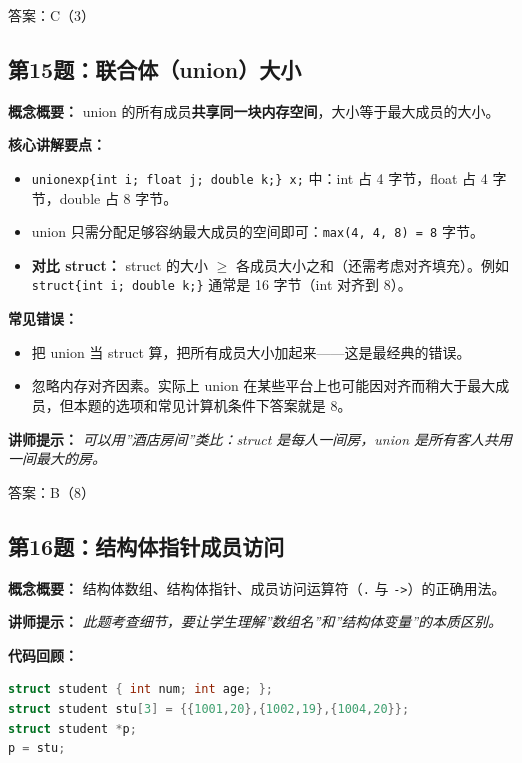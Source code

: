 {\color{highlight}答案：C（3）}

\subsection{第15题：联合体（union）大小}

\textbf{概念概要：} union 的所有成员\textbf{共享同一块内存空间}，大小等于最大成员的大小。

\textbf{核心讲解要点：}
\begin{itemize}
    \item \texttt{unionexp\{int i; float j; double k;\} x;} 中：int 占 4 字节，float 占 4 字节，double 占 8 字节。
    \item union 只需分配足够容纳最大成员的空间即可：\texttt{max(4, 4, 8) = 8} 字节。
    \item \textbf{对比 struct：} struct 的大小 $\geq$ 各成员大小之和（还需考虑对齐填充）。例如 \texttt{struct\{int i; double k;\}} 通常是 16 字节（int 对齐到 8）。
\end{itemize}

\textbf{常见错误：}
\begin{itemize}
    \item 把 union 当 struct 算，把所有成员大小加起来——这是最经典的错误。
    \item 忽略内存对齐因素。实际上 union 在某些平台上也可能因对齐而稍大于最大成员，但本题的选项和常见计算机条件下答案就是 8。
\end{itemize}

\textbf{讲师提示：} \textit{可以用”酒店房间”类比：struct 是每人一间房，union 是所有客人共用一间最大的房。}

{\color{highlight}答案：B（8）}

\subsection{第16题：结构体指针成员访问}

\textbf{概念概要：} 结构体数组、结构体指针、成员访问运算符（\texttt{.} 与 \texttt{->}）的正确用法。

\medskip
\textbf{讲师提示：} \textit{此题考查细节，要让学生理解”数组名”和”结构体变量”的本质区别。}

\textbf{代码回顾：}
\begin{lstlisting}[language=C]
struct student { int num; int age; };
struct student stu[3] = {{1001,20},{1002,19},{1004,20}};
struct student *p;
p = stu;
\end{lstlisting}


